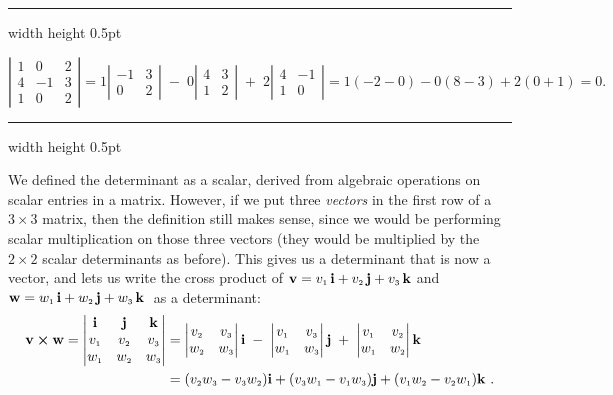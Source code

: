 \medskip
\hrule width \textwidth height 0.5pt
\begin{exmp}
 \begin{displaymath}
  \left|
  \begin{array}{rrr}
   1 & 0 & 2\\
   4 & -1 & 3\\
   1 & 0 & 2
  \end{array}\right|
  = 1 \left|\begin{array}{rr} -1 & 3 \\ 0 & 2 \end{array}\right| \;-\;
  0 \left|\begin{array}{rr} 4 & 3 \\ 1 & 2 \end{array}\right| \;+\;
  2 \left|\begin{array}{rr} 4 & -1 \\ 1 & 0 \end{array}\right|
  = 1(-2 - 0) - 0(8 - 3) + 2(0 + 1) = 0.
 \end{displaymath}
\end{exmp}
\hrule width \textwidth height 0.5pt
\smallskip

We defined the determinant as a scalar, derived from algebraic operations on scalar entries in a matrix. However,
if we put three \emph{vectors} in the first row of a $3 \times 3$ matrix, then the definition still
makes sense, since we would be performing scalar multiplication on those three vectors (they would be multiplied by
the $2 \times 2$ scalar determinants as before). This gives us a determinant that is now a vector, and lets us write the
cross product of $\mathbf{v} = v_{\scriptscriptstyle 1}\,\textbf{i} + v_{\scriptscriptstyle 2}\,\textbf{j} + v_{\scriptscriptstyle 3}\,\textbf{k}$ and $\mathbf{w} = w_{\scriptscriptstyle 1}\,\textbf{i} + w_{\scriptscriptstyle 2}\,\textbf{j} + w_{\scriptscriptstyle 3}\,\textbf{k}\;$ as a determinant:
\begin{align*}
 \mathbf{v} \bm{\times} \mathbf{w} =
 \begin{vmatrix}
  \mathbf{i} & \mathbf{j} & \mathbf{k} \\ v_{\scriptscriptstyle 1} & v_{\scriptscriptstyle 2} & v_{\scriptscriptstyle 3} \\
  w_{\scriptscriptstyle 1} & w_{\scriptscriptstyle 2} & w_{\scriptscriptstyle 3}
 \end{vmatrix} &= \begin{vmatrix} v_{\scriptscriptstyle 2} & v_{\scriptscriptstyle 3} \\ w_{\scriptscriptstyle 2} & w_{\scriptscriptstyle 3} \end{vmatrix} \mathbf{i} \;-\;
 \begin{vmatrix} v_{\scriptscriptstyle 1} & v_{\scriptscriptstyle 3} \\ w_{\scriptscriptstyle 1} & w_{\scriptscriptstyle 3} \end{vmatrix} \mathbf{j} \;+\;
 \begin{vmatrix} v_{\scriptscriptstyle 1} & v_{\scriptscriptstyle 2} \\ w_{\scriptscriptstyle 1} & w_{\scriptscriptstyle 2} \end{vmatrix} \mathbf{k}\\
 &= (v_{\scriptscriptstyle 2}w_{\scriptscriptstyle 3} -
v_{\scriptscriptstyle 3}w_{\scriptscriptstyle 2})\mathbf{i} + (v_{\scriptscriptstyle 3}w_{\scriptscriptstyle 1} - v_{\scriptscriptstyle 1}w_{\scriptscriptstyle 3})\mathbf{j} +
(v_{\scriptscriptstyle 1}w_{\scriptscriptstyle 2} - v_{\scriptscriptstyle 2}w_{\scriptscriptstyle 1})\mathbf{k} ~.
\end{align*}

